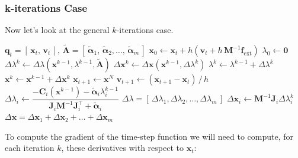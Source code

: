 \documentclass{article}
\begin{document}
\subsubsection{k-iterations Case} 
Now let's look at the general $k$-iterations case.
\begin{algorithm}[H]
\caption{XPBD Time Step with $N$ Iteration}
\label{alg:multiiter_xpbd}
\begin{algorithmic}[1]
{$\mathbf{q}_t = [\,\mathbf{x}_t,\, \mathbf{v}_t\,],\, 
\tilde{\mathbf{A}} = [\, \tilde{\boldsymbol{\alpha}}_{1},\, \tilde{\boldsymbol{\alpha}}_{2}, \dots,\, \tilde{\boldsymbol{\alpha}}_{m} \,]$}
    \State $\mathbf{x}_0 \gets \mathbf{x}_t + h (\mathbf{v}_t + h\, \mathbf{M}^{-1}\mathbf{f}_{\text{ext}})$
    \State $\lambda_0 \gets \mathbf{0}$
        \State $\Delta\lambda^k \gets \Delta\lambda(\mathbf{x}^{k-1}, \lambda^{k-1}, \tilde{\mathbf{A}})$
        \State $\Delta\mathbf{x}^k \gets \Delta\mathbf{x}(\mathbf{x}^{k-1}, \Delta\lambda^{k})$
        \State $\lambda^k \gets \lambda^{k-1} + \Delta\lambda^k$
        \State $\mathbf{x}^k \gets \mathbf{x}^{k-1} + \Delta\mathbf{x}^k$
    \EndFor
    \State $\mathbf{x}_{t+1} \gets \mathbf{x}^N$
    \State $\mathbf{v}_{t+1} \gets (\mathbf{x}_{t+1} - \mathbf{x}_t) \,/\, h$
\EndFunction
\Statex
{}
        \State $\Delta\lambda_i \gets 
            \dfrac{-\mathbf{C}_i(\mathbf{x}^{k-1}) - \tilde{\boldsymbol{\alpha}}_{i}\lambda^{k-1}_i}
                  {\mathbf{J}_i\mathbf{M}^{-1}\mathbf{J}_i^\top + \tilde{\boldsymbol{\alpha}}_{i}}$
    \EndFor
    \State $\Delta\lambda = [\, \Delta\lambda_1, \Delta\lambda_2, \dots, \Delta\lambda_m \,]$
\EndFunction
\Statex
{}
        \State $\Delta\mathbf{x}_i \gets \mathbf{M}^{-1}\mathbf{J}_i\Delta \lambda_i^k$
    \EndFor
    \State $\Delta\mathbf{x} = \Delta\mathbf{x}_1 + \Delta\mathbf{x}_2 + \dots + \Delta\mathbf{x}_m$
\EndFunction
\end{algorithmic}
\end{algorithm}
To compute the gradient of the time-step function we will need to compute, for each iteration $k$, these derivatives with respect to $\mathbf{x}_t$:
\end{document}

